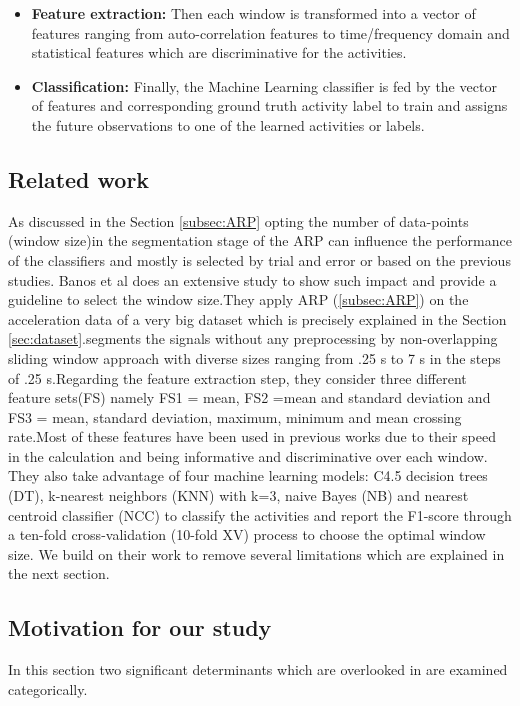 \begin{itemize}
\item \textbf{Feature extraction:}
Then each window is transformed into a vector of features ranging from auto-correlation features \cite{morris2014recofit} to time/frequency domain and statistical features which are discriminative for the activities.
\item \textbf{Classification:}
Finally, the Machine Learning classifier is fed by the vector of features and corresponding ground truth activity label to train and assigns the future observations to one of the learned activities or labels.


\end{itemize}



\subsection{Related work} \label{sub:theirwork}
As discussed in the Section \ref{subsec:ARP} opting the number of data-points (window size)in the segmentation stage of the ARP can influence the performance of the classifiers and mostly is selected by trial and error or based on the previous studies. Banos et al \cite{banos2014window} does an extensive study to show such impact and provide a guideline to select the window size.They apply ARP (\ref{subsec:ARP}) on the acceleration data of a very big dataset \cite{banos2012benchmark} which is precisely explained in the Section \ref{sec:dataset}.\cite{banos2014window}segments the signals without any preprocessing by non-overlapping sliding window approach with diverse sizes ranging from .25 s to 7 s in the steps of .25 s.Regarding the feature extraction step, they consider three different feature sets(FS) namely FS1 = {mean}, FS2 ={mean and standard deviation} and FS3 = {mean, standard deviation, maximum, minimum and mean crossing rate}.Most of these features have been used in previous works due to their speed in the calculation and being informative and discriminative over each window. They also take advantage of four machine learning models: C4.5 decision trees (DT), k-nearest neighbors (KNN) with k=3, naive Bayes (NB) and nearest centroid classifier (NCC) to classify the activities and report the F1-score through a ten-fold cross-validation (10-fold XV) process to choose the optimal window size. We build on their work to remove several limitations which are explained in the next section.

\subsection{Motivation for our study}
In this section two significant determinants which are overlooked in \cite{banos2014window} are examined categorically.

